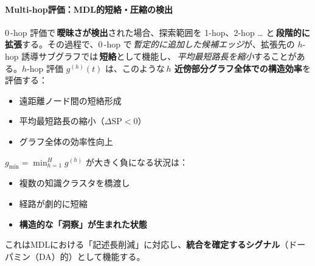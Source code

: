 \documentclass[ja=standard,xelatex]{bxjsarticle}
\begin{document}
\paragraph{Multi-hop評価：MDL的短絡・圧縮の検出}
0\,\mbox{-}hop 評価で\,\textbf{曖昧さが検出}された場合、探索範囲を 1-hop、2-hop … と\,\textbf{段階的に拡張}する。その過程で、0\,\mbox{-}hop で\,\emph{暫定的に追加した候補エッジ}が、拡張先の $h$-hop 誘導サブグラフでは\,\textbf{短絡}として機能し、\,\emph{平均最短路長を縮小}することがある。$h$-hop 評価 $g^{(h)}(t)$ は、このような\,\textbf{$h$ 近傍部分グラフ全体での構造効率}を評価する：
\begin{itemize}
  \item 遠距離ノード間の短絡形成
  \item 平均最短路長の縮小（$\Delta \text{SP} < 0$）
  \item グラフ全体の効率性向上
\end{itemize}


$g_{\min} = \min_{h=1}^{H} g^{(h)}$ が大きく負になる状況は：
\begin{itemize}
  \item 複数の知識クラスタを橋渡し
  \item 経路が劇的に短縮
  \item \textbf{構造的な「洞察」が生まれた状態}
\end{itemize}

これはMDLにおける「記述長削減」に対応し、\textbf{統合を確定するシグナル}（ドーパミン（DA）的）として機能する。
\\[0.2em]
\end{document}
